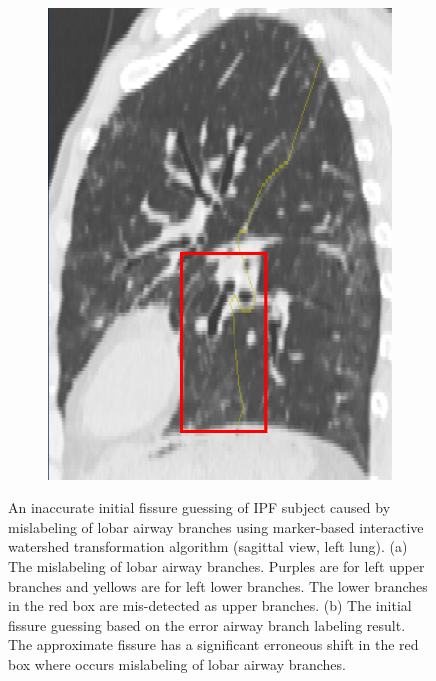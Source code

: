 {\begin{figure}[htbp]
\begin{subfigure}{.385\linewidth}
  \includegraphics[width=\linewidth,trim={{.0\wd0} {.0\wd0} {.0\wd0} {.0\wd0}},clip]{Segmentation/Image/YUAN_WateredFissureGuessing.png}
  \caption{}
  \label{fig:WateredAirwayMislabelled-b} 
\end{subfigure}
\caption{An inaccurate initial fissure guessing of IPF subject caused by mislabeling of lobar airway branches using marker-based interactive watershed transformation algorithm (sagittal view, left lung). (a) The mislabeling of lobar airway branches. Purples are for left upper branches and yellows are for left lower branches. The lower branches in the red box are mis-detected as upper branches. (b) The initial fissure guessing based on the error airway branch labeling result. The approximate fissure has a significant erroneous shift in the red box where occurs mislabeling of lobar airway branches.}
\label{fig:WateredAirwayMislabelled}
\end{figure}

}
